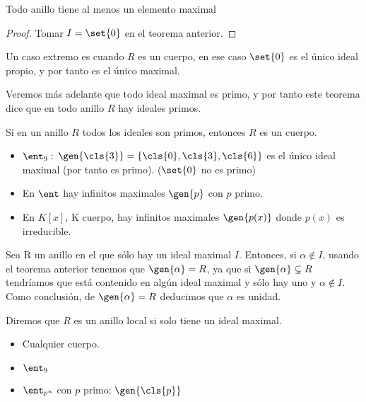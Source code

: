 \begin{prop}
	Todo anillo tiene al menos un elemento maximal
\end{prop}
\begin{proof}
	Tomar $I=\set{0}$ en el teorema anterior.
\end{proof}

\obs Un caso extremo es cuando $R$ es un cuerpo, en ese caso $\set{0}$ es el único ideal propio, y por tanto es el único maximal.

Veremos más adelante que todo ideal maximal es primo, y por tanto este teorema dice que en todo anillo $R$ hay ideales primos.

\begin{prop}
	Si en un anillo $R$ todos los ideales son primos, entonces $R$ es un cuerpo.
\end{prop}

\begin{example}
\begin{itemize}
\item $\ent_9:$ $\gen{\cls{3}} =\{\cls{0},\cls{3},\cls{6} \}$ es el único ideal maximal (por tanto es primo). ($\set{0}$ no es primo)
\item En $\ent$ hay infinitos maximales $\gen{p}$ con $p$ primo.
\item En $K[x]$, K cuerpo, hay infinitos maximales $\gen{p(x)}$ donde $p(x)$ es irreducible.
\end{itemize}
\end{example}

\obs Sea R un anillo en el que sólo hay un ideal maximal $I$. Entonces, si $\alpha \notin I$, usando el teorema anterior tenemos que $\gen{\alpha}=R$, ya que si $\gen{\alpha}\subsetneq R$ tendríamos que está contenido en algún ideal maximal y sólo hay uno y $\alpha \notin I$. Como conclusión, de $\gen{\alpha}=R$ deducimos que $\alpha$ es unidad.

\begin{defn} \label{def:AnilloLocal}
	Diremos que $R$ es un anillo local si solo tiene un ideal maximal.
\end{defn}

\begin{example}
	\begin{itemize}
	\item Cualquier cuerpo.
	\item $\ent_9$
	\item $\ent_{p^n}$ con $p$ primo: $\gen{\cls{p}}$
	\end{itemize}
\end{example}

